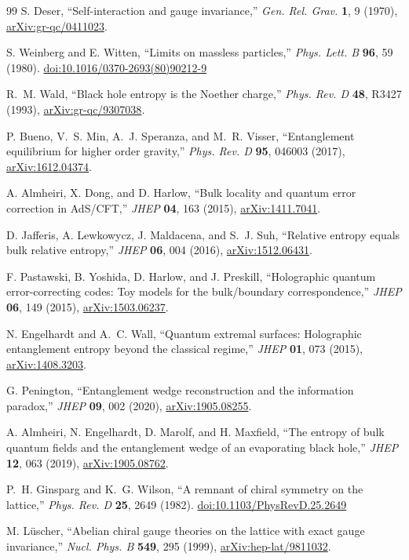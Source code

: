 \documentclass[11pt]{article}
\theoremstyle{remark}
\newcommand{\doi}[1]{\href{https://doi.org/#1}{doi:#1}}
\begin{document}
\begin{thebibliography}{99}
S. Deser,
``Self-interaction and gauge invariance,''
\emph{Gen. Rel. Grav.} \textbf{1}, 9 (1970),
\href{https://arxiv.org/abs/gr-qc/0411023}{arXiv:gr-qc/0411023}.

S. Weinberg and E. Witten,
``Limits on massless particles,''
\emph{Phys. Lett. B} \textbf{96}, 59 (1980).
\doi{10.1016/0370-2693(80)90212-9}

R.~M. Wald,
``Black hole entropy is the Noether charge,''
\emph{Phys. Rev. D} \textbf{48}, R3427 (1993),
\href{https://arxiv.org/abs/gr-qc/9307038}{arXiv:gr-qc/9307038}.

P. Bueno, V.~S. Min, A.~J. Speranza, and M.~R. Visser,
``Entanglement equilibrium for higher order gravity,''
\emph{Phys. Rev. D} \textbf{95}, 046003 (2017),
\href{https://arxiv.org/abs/1612.04374}{arXiv:1612.04374}.

A. Almheiri, X. Dong, and D. Harlow,
``Bulk locality and quantum error correction in AdS/CFT,''
\emph{JHEP} \textbf{04}, 163 (2015),
\href{https://arxiv.org/abs/1411.7041}{arXiv:1411.7041}.

D. Jafferis, A. Lewkowycz, J. Maldacena, and S.~J. Suh,
``Relative entropy equals bulk relative entropy,''
\emph{JHEP} \textbf{06}, 004 (2016),
\href{https://arxiv.org/abs/1512.06431}{arXiv:1512.06431}.

F. Pastawski, B. Yoshida, D. Harlow, and J. Preskill,
``Holographic quantum error-correcting codes: Toy models for the
bulk/boundary correspondence,''
\emph{JHEP} \textbf{06}, 149 (2015),
\href{https://arxiv.org/abs/1503.06237}{arXiv:1503.06237}.

N. Engelhardt and A.~C. Wall,
``Quantum extremal surfaces: Holographic entanglement entropy beyond the
classical regime,''
\emph{JHEP} \textbf{01}, 073 (2015),
\href{https://arxiv.org/abs/1408.3203}{arXiv:1408.3203}.

G. Penington,
``Entanglement wedge reconstruction and the information paradox,''
\emph{JHEP} \textbf{09}, 002 (2020),
\href{https://arxiv.org/abs/1905.08255}{arXiv:1905.08255}.

A. Almheiri, N. Engelhardt, D. Marolf, and H. Maxfield,
``The entropy of bulk quantum fields and the entanglement wedge of an
evaporating black hole,''
\emph{JHEP} \textbf{12}, 063 (2019),
\href{https://arxiv.org/abs/1905.08762}{arXiv:1905.08762}.

P.~H. Ginsparg and K.~G. Wilson,
``A remnant of chiral symmetry on the lattice,''
\emph{Phys. Rev. D} \textbf{25}, 2649 (1982).
\doi{10.1103/PhysRevD.25.2649}

M. L\"uscher,
``Abelian chiral gauge theories on the lattice with exact gauge
invariance,''
\emph{Nucl. Phys. B} \textbf{549}, 295 (1999),
\href{https://arxiv.org/abs/hep-lat/9811032}{arXiv:hep-lat/9811032}.

\end{thebibliography}
\end{document}
